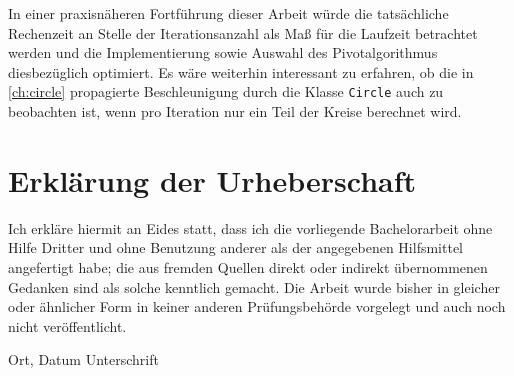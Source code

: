\documentclass[11pt,a4paper,twoside,ngerman,openany,bibliography=totoc]{scrbook}
\theoremstyle{plain}
\theoremstyle{definition}
\begin{document}
In einer praxisnäheren Fortführung dieser Arbeit würde die tatsächliche Rechenzeit an Stelle der Iterationsanzahl als Maß für die Laufzeit betrachtet werden und die Implementierung sowie Auswahl des Pivotalgorithmus diesbezüglich optimiert. Es wäre weiterhin interessant zu erfahren, ob die in \cref{ch:circle} propagierte Beschleunigung durch die Klasse \lstinline|Circle| auch zu beobachten ist, wenn pro Iteration nur ein Teil der Kreise berechnet wird.

\backmatter
\printbibliography[title=Literaturverzeichnis]

\chapter*{Erklärung der Urheberschaft}

Ich erkläre hiermit an Eides statt, dass ich die vorliegende Bachelorarbeit ohne Hilfe Dritter und ohne Benutzung anderer als der angegebenen Hilfsmittel angefertigt habe; die aus fremden Quellen direkt oder indirekt übernommenen Gedanken sind als solche kenntlich gemacht. Die Arbeit wurde bisher in gleicher oder ähnlicher Form in keiner anderen Prüfungsbehörde vorgelegt und auch noch nicht veröffentlicht.

\vspace{3cm}
\hspace{2cm} Ort, Datum \hfill Unterschrift \hspace{2cm}
\clearpage
\end{document}
